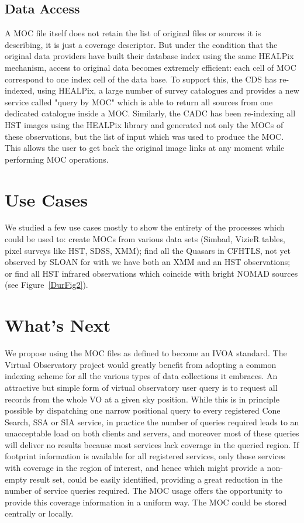 \subsection{Data Access}
A MOC file itself does not retain the list of original files or sources it is describing, it is just a coverage descriptor. But under the condition that the original data providers have built their database index using the same HEALPix mechanism, access to original data becomes extremely efficient: each cell of MOC correspond to one index cell of the data base. 
To support this, the CDS has re-indexed, using HEALPix, a large number of survey catalogues and provides a new service called "query by MOC" which is able to return all sources from one dedicated catalogue inside a MOC. Similarly, the CADC has been re-indexing all HST images using the HEALPix library and generated not only the MOCs of these observations, but the list of input which was used to produce the MOC. This allows the user to get back the original image links at any moment while performing MOC operations.

\section{Use Cases}
We studied a few use cases mostly to show the entirety of the processes which could be used to: create MOCs from various data sets (Simbad, VizieR tables, pixel surveys like HST, SDSS, XMM); find all the Quasars in CFHTLS, not yet observed by SLOAN for with we have both an XMM and an HST observations; or find all HST infrared observations which coincide with bright NOMAD sources (see Figure~\ref{DurFig2}).


\section{What's Next}

We propose using the MOC files as defined to become an IVOA standard. 
The Virtual Observatory project would greatly benefit from adopting a common indexing scheme for all the various types of data collections it embraces. 
An attractive but simple form of virtual observatory user query is
to request all records from the whole VO at a given sky position.
While this is in principle possible by dispatching one narrow
positional query to every registered Cone Search, SSA or SIA service,
in practice the number of queries required leads to an unacceptable
load on both clients and servers, and moreover most of these queries
will deliver no results because most services lack coverage in the
queried region. If footprint information is available for all registered services, only those
services with coverage in the region of interest, and hence which
might provide a non-empty result set, could be easily identified,
providing a great reduction in the number of service queries required.
The MOC usage offers the opportunity to provide
this coverage information in a uniform way. The MOC could be stored centrally or locally.


